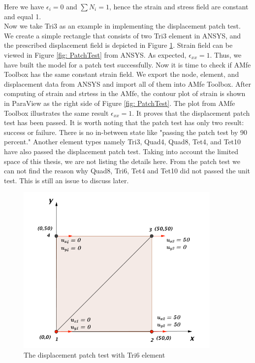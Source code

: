 Here we have $\epsilon_i = 0$ and $\sum N_i = 1$, hence the strain and stress field are constant and equal 1. \\
Now we take Tri3 as an example in implementing the displacement patch test. We create a simple rectangle that consists of two Tri3 element in ANSYS, and the prescribed displacement field is depicted in Figure \ref{fig: PatchMuster}. Strain field can be viewed in Figure \ref{fig: PatchTest} from ANSYS. As expected, $\epsilon_{xx} = 1$. Thus, we have built the model for a patch test successfully. Now it is time to check if AMfe Toolbox has the same constant strain field. We export the node, element, and displacement data from ANSYS and import all of them into AMfe Toolbox. After computing of strain and strtess in the AMfe, the contour plot of strain is shown in ParaView as the right side of Figure \ref{fig: PatchTest}. The plot from AMfe Toolbox illustrates the same result $\epsilon_ {xx} = 1$. It proves that the displacement patch test has been passed. It is worth noting that the patch test has only two result: success or failure. There is no in-between state like "passing the patch test by 90 percent." Another element types namely Tri3, Quad4, Quad8, Tet4, and Tet10 have also passed the displacement patch test. Taking into account the limited space of this thesis, we are not listing the details here. From the patch test we can not find the reason why Quad8, Tri6, Tet4 and Tet10 did not passed the unit test. This is still an issue to discuss later.

\begin{figure}
	\begin{center}
		\includegraphics[width=10cm,clip]{PatchMuster.pdf} 			
		\caption{The displacement patch test with Tri6 element} \label{fig: PatchMuster}
	\end{center}
\end{figure}

